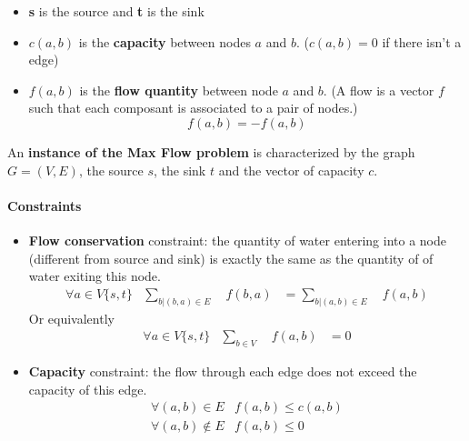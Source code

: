 \begin{itemize}
    \item \textbf{s} is the source and \textbf{t} is the sink
    \item $c(a, b)$ is the \textbf{capacity} between nodes $a$ and $b$.
        ($c(a, b)=0$ if there isn't a edge)

    \item $f(a, b)$ is the \textbf{flow quantity} between node $a$ and
        $b$. (A flow is a vector $f$ such that each composant is associated to a
        pair of nodes.)
$$f(a,b) = -f(a,b)$$ 
\end{itemize}

An \textbf{instance of the Max Flow problem} is characterized by the
graph $G = (V, E)$, the source $s$, the sink $t$ and the vector of
capacity $c$.

\paragraph{Constraints}
\begin{itemize} 
    \item \textbf{Flow conservation} constraint: the
        quantity of water entering into a node (different from
        source and sink) is exactly the same as the quantity of of
        water exiting this node.
        \begin{eqnarray*}
            \forall a\in V\{s,t\} & 
            \sum_{b|(b,a) \in E} \quad f(b,a)  &= \sum_{b|(a,b) \in E}
            \quad f(a,b) 
        \end{eqnarray*}
        Or equivalently
        \begin{eqnarray*}
            \forall a\in V\{s,t\} & 
            \sum_{b \in V} \quad f(a,b)  &= 0
        \end{eqnarray*}

\item \textbf{Capacity} constraint: the flow through each edge does
    not exceed the capacity of this edge.
    \begin{eqnarray*}
        \forall (a,b) \in E & f(a, b) \leq c(a, b)\\
        \forall (a,b) \notin E & f(a, b) \leq 0
    \end{eqnarray*}
\end{itemize}

